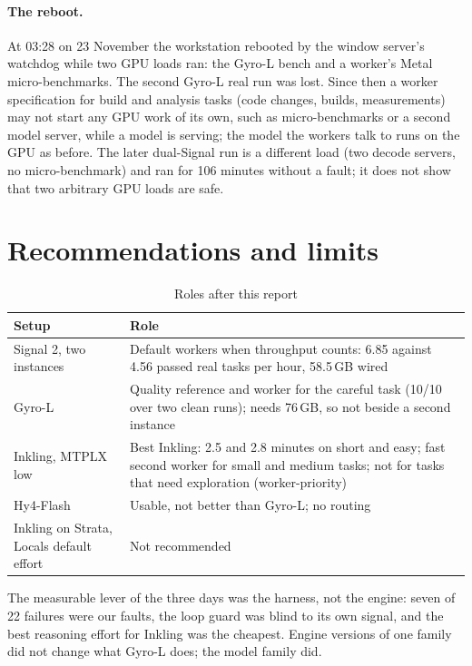 \paragraph{The reboot.} At 03:28 on 23 November the workstation rebooted by the window server's watchdog while two GPU
loads ran: the Gyro-L bench and a worker's Metal micro-benchmarks. The second Gyro-L real run was lost. Since then a worker
specification for build and analysis tasks (code changes, builds, measurements) may not start any GPU work of its own, such as micro-benchmarks or a second model server, while a model is serving; the model the workers talk to runs on the GPU as before. The later dual-Signal run is a different load (two decode servers, no
micro-benchmark) and ran for 106 minutes without a fault; it does not show that two arbitrary GPU loads are safe.

\section{Recommendations and limits}\label{sec:recommendations}

\begin{table}[H]
\centering
\small
\caption{Roles after this report}\label{tab:roles5}
\begin{tabular}{P{3.4cm}P{10.2cm}}
\toprule
Setup & Role \\
\midrule
Signal 2, two instances & Default workers when throughput counts: 6.85 against 4.56 passed real tasks per hour, 58.5\,GB wired \\
Gyro-L & Quality reference and worker for the careful task (10/10 over two clean runs); needs 76\,GB, so not beside a second instance \\
Inkling, MTPLX low & Best Inkling: 2.5 and 2.8 minutes on short and easy; fast second worker for small and medium tasks; not for tasks that need exploration (worker-priority) \\
Hy4-Flash & Usable, not better than Gyro-L; no routing \\
Inkling on Strata, Locals default effort & Not recommended \\
\bottomrule
\end{tabular}
\end{table}

The measurable lever of the three days was the harness, not the engine: seven of 22 failures were our faults, the loop
guard was blind to its own signal, and the best reasoning effort for Inkling was the cheapest. Engine versions of one family
did not change what Gyro-L does; the model family did.

